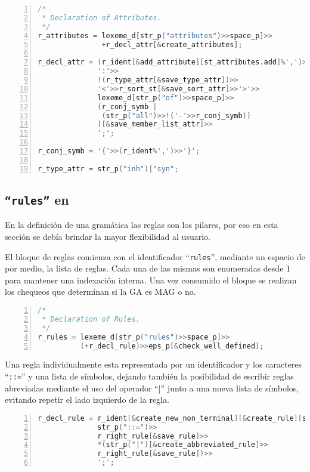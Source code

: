 \begin{lstlisting}[language=C++, basicstyle=\scriptsize, numbers=left, numbersep=5pt, numberstyle=\tiny]
/*
 * Declaration of Attributes.
 */
r_attributes = lexeme_d[str_p("attributes")>>space_p]>>
               +r_decl_attr[&create_attributes];

r_decl_attr = (r_ident[&add_attribute][st_attributes.add]%',')>>
              ':'>>
              !(r_type_attr[&save_type_attr])>>
              '<'>>r_sort_st[&save_sort_attr]>>'>'>>
              lexeme_d[str_p("of")>>space_p]>>
              (r_conj_symb |
               (str_p("all")>>!('-'>>r_conj_symb))
              )[&save_member_list_attr]>>
              ';';

r_conj_symb = '{'>>(r_ident%',')>>'}';

r_type_attr = str_p("inh")|"syn";
\end{lstlisting}

\subsection{\texttt{``rules''} en \spirit}

En la definición de una gramática las reglas son los pilares, por eso en esta sección se debía brindar la mayor flexibilidad al usuario.

El bloque de reglas comienza con el identificador ``\texttt{rules}'', mediante un espacio de por medio, la lista  de reglas. Cada una de las mismas son enumeradas desde 1 para mantener una indexación interna. Una vez consumido el bloque se realizan los chequeos que determinan si la GA es MAG o no.

\begin{lstlisting}[language=C++, basicstyle=\scriptsize, numbers=left, numbersep=5pt, numberstyle=\tiny]
/*
 * Declaration of Rules.
 */
r_rules = lexeme_d[str_p("rules")>>space_p]>>
          (+r_decl_rule)>>eps_p[&check_well_defined];
\end{lstlisting}

Una regla individualmente esta representada por un identificador y los caracteres ``\texttt{::=}'' y una lista de símbolos, dejando también la posibilidad de escribir reglas abreviadas mediante el uso del operador ``|'' junto a una nueva lista de símbolos, evitando repetir el lado izquierdo de la regla.

\begin{lstlisting}[language=C++, basicstyle=\scriptsize, numbers=left, numbersep=5pt, numberstyle=\tiny]
r_decl_rule = r_ident[&create_new_non_terminal][&create_rule][st_non_terminal.add]>>
              str_p("::=")>>
              r_right_rule[&save_rule]>>
              *(str_p("|")[&create_abbreviated_rule]>>
              r_right_rule[&save_rule])>>
              ';';
\end{lstlisting}


